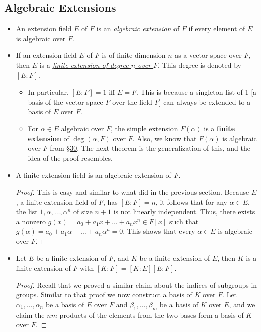 \documentclass[11pt]{article}
\newcommand{\lk}[2]{\hyperlink{subsection.#1.#2}{\S#2}} %
\newcommand{\df}[1]{\ul{\textit{\textsf{#1}}}}
\begin{document}
\subsection{Algebraic Extensions}
\begin{itemize}
    \item An extension field $E$ of $F$ is an \df{algebraic extension} of $F$ if every element of $E$ is algebraic over $F$.
    \item If an extension field $E$ of $F$ is of finite dimension $n$ as a vector space over $F$, then $E$ is a \df{finite extension of degree $n$ over $F$}. This degree is denoted by $[E:F]$.
    \begin{itemize}
         \item In particular, $[E:F] = 1$ iff $E = F$. This is because a singleton list of 1 [a basis of the vector space $F$ over the field $F$] can always be extended to a basis of $E$ over $F$.
        \item For $\alpha \in E$ algebraic over $F$, the simple extension $F(\alpha)$ is a \textbf{finite extension} of $\deg(\alpha,F)$ over $F$. Also, we know that $F(\alpha)$ is algebraic over $F$ from \lk{6}{30}. The next theorem is the generalization of this, and the idea of the proof resembles.
    \end{itemize}
    \item A finite extension field is an algebraic extension of $F$.
    \begin{proof}
        This is easy and similar to what did in the previous section. Because $E$, a finite extension field of $F$, has $[E:F] = n$, it follows that for any $\alpha \in E$, the list $1, \alpha, \dots, \alpha^n$ of size $n+1$ is not linearly independent. Thus, there exists a nonzero $g(x) = a_0 + a_1 x+ \dots + a_n x^n \in F[x]$ such that $g(\alpha) = a_0 + a_1 \alpha + \dots +a_n \alpha^n = 0$. This shows that every $\alpha \in E$ is algebraic over $F$.
    \end{proof}
    \item Let $E$ be a finite extension of $F$, and $K$ be a finite extension of $E$, then $K$ is a finite extension of $F$ with $[K:F] = [K:E][E:F]$. 
    \begin{proof}
        Recall that we proved a similar claim about the indices of subgroups in groups. Similar to that proof we now construct a basis of $K$ over $F$. Let $\alpha_1,\dots,\alpha_n$ be a basis of $E$ over $F$ and $\beta_1,\dots,\beta_m$ be a basis of $K$ over $E$, and we claim the $nm$ products of the elements from the two bases form a basis of $K$ over $F$.
        

\end{proof}
\end{itemize}
\end{document}
